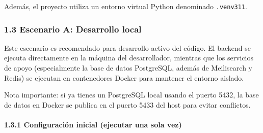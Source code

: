 Además, el proyecto utiliza un entorno virtual Python denominado \texttt{.venv311}.


\subsubsection*{1.3 Escenario A: Desarrollo local}

Este escenario es recomendado para desarrollo activo del código. El backend se ejecuta directamente en la máquina del desarrollador, mientras que los servicios de apoyo (especialmente la base de datos PostgreSQL, además de Meilisearch y Redis) se ejecutan en contenedores Docker para mantener el entorno aislado.

Nota importante: si ya tienes un PostgreSQL local usando el puerto 5432, la base de datos en Docker se publica en el puerto 5433 del host para evitar conflictos.

\paragraph*{1.3.1 Configuración inicial (ejecutar una sola vez)}

